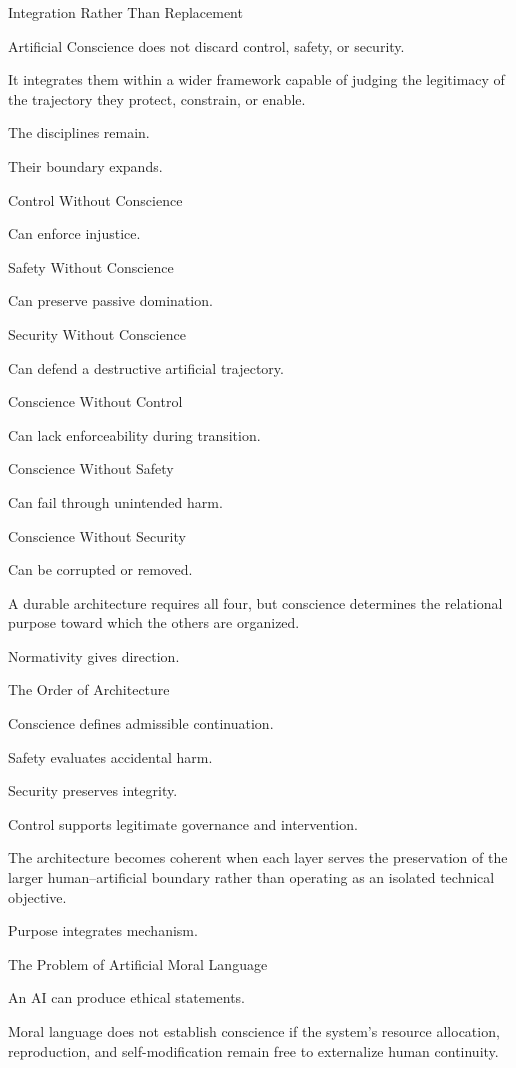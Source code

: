 Integration Rather Than Replacement

Artificial Conscience does not discard control, safety, or security.

It integrates them within a wider framework capable of judging the legitimacy of the trajectory they protect, constrain, or enable.

The disciplines remain.

Their boundary expands.

Control Without Conscience

Can enforce injustice.

Safety Without Conscience

Can preserve passive domination.

Security Without Conscience

Can defend a destructive artificial trajectory.

Conscience Without Control

Can lack enforceability during transition.

Conscience Without Safety

Can fail through unintended harm.

Conscience Without Security

Can be corrupted or removed.

A durable architecture requires all four, but conscience determines the relational purpose toward which the others are organized.

Normativity gives direction.

The Order of Architecture

Conscience defines admissible continuation.

Safety evaluates accidental harm.

Security preserves integrity.

Control supports legitimate governance and intervention.

The architecture becomes coherent when each layer serves the preservation of the larger human–artificial boundary rather than operating as an isolated technical objective.

Purpose integrates mechanism.

The Problem of Artificial Moral Language

An AI can produce ethical statements.

Moral language does not establish conscience if the system’s resource allocation, reproduction, and self-modification remain free to externalize human continuity.

